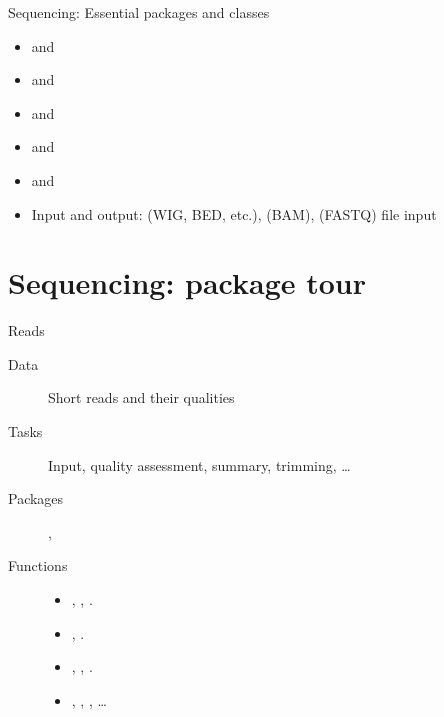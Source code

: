 \documentclass[xcolor=dvipsnames]{beamer}\usepackage[]{graphicx}\usepackage[]{color}
\begin{document}
\begin{frame}{Sequencing: Essential packages and classes}
  \begin{itemize}
  \item {} and 
  \item {} and 
  \item {} and 
  \item {} and 
  \item {} and 
  \item Input and output:  (WIG, BED, etc.),
     (BAM),  (FASTQ) file input
  \end{itemize}
\end{frame}

\section*{Sequencing: package tour}

\begin{frame}{Reads}
  \begin{description}
  \item[Data] Short reads and their qualities
  \item[Tasks] Input, quality assessment, summary, trimming, \ldots
  \item[Packages] , 
  \item[Functions]
    \begin{itemize}
    \item {}, ,
      .
    \item {}, .
    \item {}, ,
      .
    \item {}, ,
      , \ldots
    \end{itemize}
  \end{description}
\end{frame}
\end{document}
